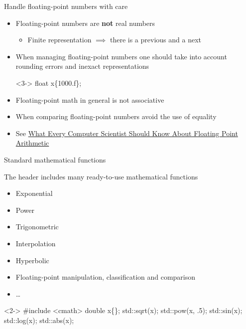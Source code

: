 \begin{frame}[fragile]{Handle floating-point numbers with care}

  \begin{itemize}
  \item<1-> Floating-point numbers are \textbf{not} real numbers
    \begin{itemize}
    \item Finite representation $\implies$ there is a previous and a next
    \end{itemize}
  \item<2-> When managing floating-point numbers one should take into account
    rounding errors and inexact representations
    \begin{codeblock}<3->{
float x\{1\textquotesingle000.f\};
}\end{codeblock}
  \item<8-> Floating-point math in general is not associative
  \item<9-> When comparing floating-point numbers avoid the use of equality
  \item<10-> See \href{https://cr.yp.to/2005-590/goldberg.pdf}{What Every
      Computer Scientist Should Know About Floating Point Arithmetic}
 \end{itemize}

\end{frame}

\begin{frame}[fragile]{Standard mathematical functions}

  The \href{https://en.cppreference.com/w/cpp/header/cmath}{} header
  includes many ready-to-use mathematical functions
  \begin{itemize}
  \item Exponential
  \item Power
  \item Trigonometric
  \item Interpolation
  \item Hyperbolic
  \item Floating-point manipulation, classification and comparison
  \item \ldots
  \end{itemize}

  \begin{codeblock}<2->{
#include <cmath>
\ddd
double x\{\ddd\};
std::sqrt(x);
std::pow(x, .5);
std::sin(x);
std::log(x);
std::abs(x);}\end{codeblock}
\end{frame}

